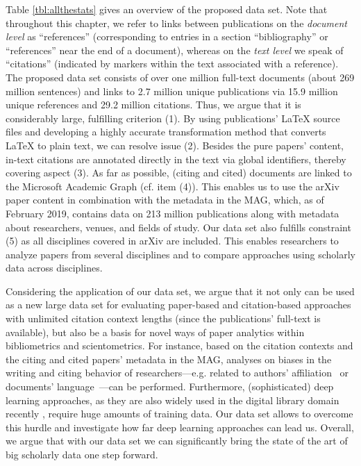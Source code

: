 Table \ref{tbl:allthestats} gives an overview of the proposed data set. Note that throughout this chapter, we refer to links between publications on the \emph{document level} as ``references'' (corresponding to entries in a section ``bibliography'' or ``references'' near the end of a document), whereas on the \emph{text level} we speak of ``citations'' (indicated by markers within the text associated with a reference). The proposed data set consists of over one million full-text documents (about 269 million sentences) and links to 2.7 million unique publications via 15.9 million unique references and 29.2 million citations.
Thus, we argue that it is considerably large, fulfilling criterion (1). By using publications' \LaTeX{} source files and developing a highly accurate transformation method that converts \LaTeX{} to plain text, we can resolve issue (2). Besides the pure papers' content, in-text citations are annotated directly in the text via global identifiers, thereby covering aspect (3). As far as possible, (citing and cited) documents are linked to the Microsoft Academic Graph \cite{Sinha2015} (cf. item (4)). This enables us to use the arXiv paper content in combination with the metadata in the MAG, which, as of February 2019, contains data on 213 million publications along with metadata about researchers, venues, and fields of study. Our data set also fulfills constraint (5) as all disciplines covered in arXiv are included. This enables researchers to analyze papers from several disciplines and to compare approaches using scholarly data across disciplines.

Considering the application of our data set, we argue that it not only can be used as a new large data set for evaluating paper-based and citation-based approaches with unlimited citation context lengths (since the publications' full-text is available),
but also be a basis for novel ways of paper analytics within bibliometrics and scientometrics. For instance, based on the citation contexts and the citing and cited papers' metadata in the MAG, analyses on biases in the writing and citing behavior of researchers---e.g. related to authors' affiliation~\cite{Reingewertz2018} or documents' language~\cite{Liang2013,Liu2018}---can be performed.
Furthermore, (sophisticated) deep learning approaches, as they are also widely used in the digital library domain recently \cite{Ebensu2017}, require huge amounts of training data. Our data set allows to overcome this hurdle and investigate how far deep learning approaches can lead us.
Overall, we argue that with our data set we can significantly bring the state of the art of big scholarly data one step forward.

